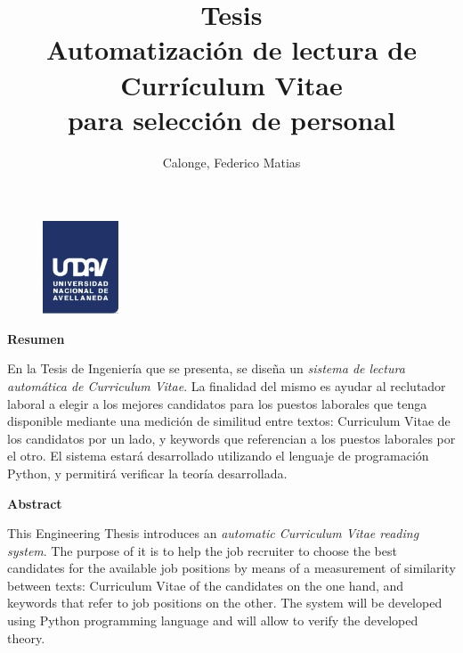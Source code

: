 \documentclass[12pt,a4paper]{article}
\author{
  Calonge, Federico Matias\\
  \text{calongefederico@gmail.com}
}
\title{
  Tesis \\
  \large Automatización de lectura de Currículum Vitae  \\
    para selección de personal}
\begin{document}
\begin{figure}
  \centering
  \includegraphics[width=0.2\textwidth]{images/undav-logo.png} 	%
  \label{fig:undav-logo}
\end{figure}
\maketitle       		%

\cleardoublepage    %

\begin{center}
    \Large
    \vspace{0.9cm}
    \textbf{Resumen}
    
\end{center}

En la Tesis de Ingeniería que se presenta, se diseña un \textit{sistema de lectura automática de Curriculum Vitae}. La finalidad del mismo es ayudar al reclutador laboral a elegir a los mejores candidatos para los puestos laborales que tenga disponible mediante una medición de similitud entre textos: Curriculum Vitae de los candidatos por un lado, y keywords que referencian a los puestos laborales por el otro.
El sistema estará desarrollado utilizando el lenguaje de programación Python, y permitirá verificar la teoría desarrollada.

\begin{center}
    \Large
    \vspace{0.9cm}
    \textbf{Abstract}
\end{center}

This Engineering Thesis introduces an \textit{automatic Curriculum Vitae reading system}. The purpose of it is to help the job recruiter to choose the best candidates for the available job positions by means of a measurement of similarity between texts: Curriculum Vitae of the candidates on the one hand, and keywords that refer to job positions on the other. The system will be developed using Python programming language and will allow to verify the developed theory. 

\cleardoublepage    %
\end{document}

